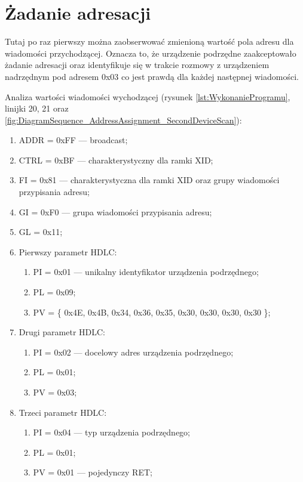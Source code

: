 \section{Żadanie adresacji}
Tutaj po raz pierwszy można zaobserwować zmienioną wartość pola adresu dla wiadomości
przychodzącej. Oznacza to, że urządzenie podrzędne zaakceptowało żadanie adresacji 
oraz identyfikuje się w trakcie rozmowy z urządzeniem nadrzędnym pod adresem 0x03 co
jest prawdą dla każdej następnej wiadomości.

Analiza wartości wiadomości wychodzącej 
(rysunek \ref{lst:WykonanieProgramu}, linijki {20, 21} oraz \ref{fig:DiagramSequence_AddressAssignment_SecondDeviceScan}):
\begin{enumerate}
    \item ADDR = 0xFF --- broadcast;
    \item CTRL = 0xBF --- charakterystyczny dla ramki XID;
    \item FI = 0x81 --- charakterystyczna dla ramki XID oraz grupy wiadomości przypisania adresu;
    \item GI = 0xF0 --- grupa wiadomości przypisania adresu;
    \item GL = 0x11;
    \item Pierwszy parametr HDLC:
    \begin{enumerate}
        \item PI = 0x01 --- unikalny identyfikator urządzenia podrzędnego;
        \item PL = 0x09;
        \item PV = \{ 0x4E, 0x4B, 0x34, 0x36, 0x35, 0x30, 0x30, 0x30, 0x30 \};
    \end{enumerate}
    \item Drugi parametr HDLC:
    \begin{enumerate}
        \item PI = 0x02 --- docelowy adres urządzenia podrzędnego;
        \item PL = 0x01;
        \item PV = 0x03;
    \end{enumerate}
    \item Trzeci parametr HDLC:
    \begin{enumerate}
        \item PI = 0x04 --- typ urządzenia podrzędnego;
        \item PL = 0x01;
        \item PV = 0x01 --- pojedynczy RET;
    \end{enumerate}
\end{enumerate}

